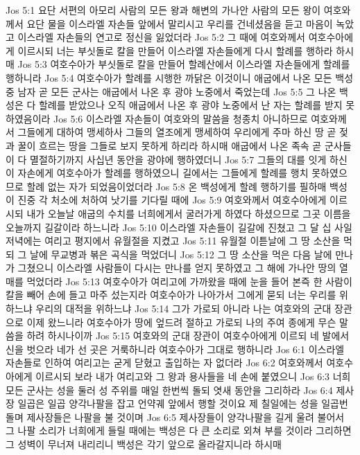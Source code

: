 Jos 5:1  요단 서편의 아모리 사람의 모든 왕과 해변의 가나안 사람의 모든 왕이 여호와께서 요단 물을 이스라엘 자손들 앞에서 말리시고 우리를 건네셨음을 듣고 마음이 녹았고 이스라엘 자손들의 연고로 정신을 잃었더라
Jos 5:2  그 때에 여호와께서 여호수아에게 이르시되 너는 부싯돌로 칼을 만들어 이스라엘 자손들에게 다시 할례를 행하라 하시매
Jos 5:3  여호수아가 부싯돌로 칼을 만들어 할례산에서 이스라엘 자손들에게 할례를 행하니라
Jos 5:4  여호수아가 할례를 시행한 까닭은 이것이니 애굽에서 나온 모든 백성 중 남자 곧 모든 군사는 애굽에서 나온 후 광야 노중에서 죽었는데
Jos 5:5  그 나온 백성은 다 할례를 받았으나 오직 애굽에서 나온 후 광야 노중에서 난 자는 할례를 받지 못하였음이라
Jos 5:6  이스라엘 자손들이 여호와의 말씀을 청종치 아니하므로 여호와께서 그들에게 대하여 맹세하사 그들의 열조에게 맹세하여 우리에게 주마 하신 땅 곧 젖과 꿀이 흐르는 땅을 그들로 보지 못하게 하리라 하시매 애굽에서 나온 족속 곧 군사들이 다 멸절하기까지 사십년 동안을 광야에 행하였더니
Jos 5:7  그들의 대를 잇게 하신 이 자손에게 여호수아가 할례를 행하였으니 길에서는 그들에게 할례를 행치 못하였으므로 할례 없는 자가 되었음이었더라
Jos 5:8  온 백성에게 할례 행하기를 필하매 백성이 진중 각 처소에 처하여 낫기를 기다릴 때에
Jos 5:9  여호와께서 여호수아에게 이르시되 내가 오늘날 애굽의 수치를 너희에게서 굴러가게 하였다 하셨으므로 그곳 이름을 오늘까지 길갈이라 하느니라
Jos 5:10  이스라엘 자손들이 길갈에 진쳤고 그 달 십 사일 저녁에는 여리고 평지에서 유월절을 지켰고
Jos 5:11  유월절 이튿날에 그 땅 소산을 먹되 그 날에 무교병과 볶은 곡식을 먹었더니
Jos 5:12  그 땅 소산을 먹은 다음 날에 만나가 그쳤으니 이스라엘 사람들이 다시는 만나를 얻지 못하였고 그 해에 가나안 땅의 열매를 먹었더라
Jos 5:13  여호수아가 여리고에 가까왔을 때에 눈을 들어 본즉 한 사람이 칼을 빼어 손에 들고 마주 섰는지라 여호수아가 나아가서 그에게 묻되 너는 우리를 위하느냐 우리의 대적을 위하느냐
Jos 5:14  그가 가로되 아니라 나는 여호와의 군대 장관으로 이제 왔느니라 여호수아가 땅에 엎드려 절하고 가로되 나의 주여 종에게 무슨 말씀을 하려 하시나이까
Jos 5:15  여호와의 군대 장관이 여호수아에게 이르되 네 발에서 신을 벗으라 네가 선 곳은 거룩하니라 여호수아가 그대로 행하니라
Jos 6:1  이스라엘 자손들로 인하여 여리고는 굳게 닫혔고 출입하는 자 없더라
Jos 6:2  여호와께서 여호수아에게 이르시되 보라 내가 여리고와 그 왕과 용사들을 네 손에 붙였으니
Jos 6:3  너희 모든 군사는 성을 둘러 성 주위를 매일 한번씩 돌되 엿새 동안을 그리하라
Jos 6:4  제사장 일곱은 일곱 양각나팔을 잡고 언약궤 앞에서 행할 것이요 제 칠일에는 성을 일곱번 돌며 제사장들은 나팔을 불 것이며
Jos 6:5  제사장들이 양각나팔을 길게 울려 불어서 그 나팔 소리가 너희에게 들릴 때에는 백성은 다 큰 소리로 외쳐 부를 것이라 그리하면그 성벽이 무너져 내리리니 백성은 각기 앞으로 올라갈지니라 하시매
